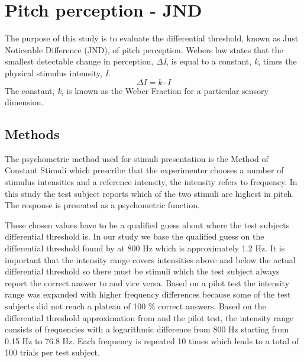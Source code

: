 \chapter*{Pitch perception - JND}
%
The purpose of this study is to evaluate the differential threshold, known as Just Noticeable Difference (JND), of pitch perception. Webers law states that the smallest detectable change in perception, \textit{$\Delta$I}, is equal to a constant, \textit{k}, times the physical stimulus intensity, \textit{I}. 
%
\begin{equation}
\Delta I = k \cdot I
\end{equation}
%
The constant, \textit{k}, is known as the Weber Fraction for a particular sensory dimension.
%

\section*{Methods}
%
The psychometric method used for stimuli presentation is the Method of Constant Stimuli which prescribe that the experimenter chooses a number of stimulus intensities and a reference intensity, the intensity refers to frequency. In this study the test subject reports which of the two stimuli are highest in pitch. The response is presented as a psychometric function. 

These chosen values have to be a qualified guess about where the test subjects differential threshold is. In our study we base the qualified guess on the differential threshold found by \citep{Wier1977} at 800 Hz which is approximately 1.2 Hz. It is important that the intensity range covers intensities above and below the actual differential threshold so there must be stimuli which the test subject always report the correct answer to and vice versa. Based on a pilot test the intensity range was expanded with higher frequency differences because some of the test subjects did not reach a plateau of 100 \% correct answers. Based on the differential threshold approximation from \citep{Wier1977} and the pilot test, the intensity range consists of frequencies with a logarithmic difference from 800 Hz starting from 0.15 Hz to 76.8 Hz. Each frequency is repeated 10 times which leads to a total of 100 trials per test subject.  

